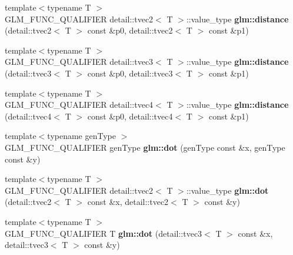 \begin{DoxyCompactItemize}
\item 
\hypertarget{namespaceglm_a02e1b17b70ee3ddd270c01aea45e5e82}{{\footnotesize template$<$typename T $>$ }\\\-G\-L\-M\-\_\-\-F\-U\-N\-C\-\_\-\-Q\-U\-A\-L\-I\-F\-I\-E\-R \*
detail\-::tvec2$<$ \-T $>$\-::value\-\_\-type {\bfseries glm\-::distance} (detail\-::tvec2$<$ \-T $>$ const \&p0, detail\-::tvec2$<$ \-T $>$ const \&p1)}\label{namespaceglm_a02e1b17b70ee3ddd270c01aea45e5e82}

\item 
\hypertarget{namespaceglm_a703b08cc8cd10426eb3885f4a9778706}{{\footnotesize template$<$typename T $>$ }\\\-G\-L\-M\-\_\-\-F\-U\-N\-C\-\_\-\-Q\-U\-A\-L\-I\-F\-I\-E\-R \*
detail\-::tvec3$<$ \-T $>$\-::value\-\_\-type {\bfseries glm\-::distance} (detail\-::tvec3$<$ \-T $>$ const \&p0, detail\-::tvec3$<$ \-T $>$ const \&p1)}\label{namespaceglm_a703b08cc8cd10426eb3885f4a9778706}

\item 
\hypertarget{namespaceglm_aba6ad5ff80b3e5400708fea100bf8a76}{{\footnotesize template$<$typename T $>$ }\\\-G\-L\-M\-\_\-\-F\-U\-N\-C\-\_\-\-Q\-U\-A\-L\-I\-F\-I\-E\-R \*
detail\-::tvec4$<$ \-T $>$\-::value\-\_\-type {\bfseries glm\-::distance} (detail\-::tvec4$<$ \-T $>$ const \&p0, detail\-::tvec4$<$ \-T $>$ const \&p1)}\label{namespaceglm_aba6ad5ff80b3e5400708fea100bf8a76}

\item 
\hypertarget{namespaceglm_aaa19f6c91c9d46f783e296789dfaf2d9}{{\footnotesize template$<$typename gen\-Type $>$ }\\\-G\-L\-M\-\_\-\-F\-U\-N\-C\-\_\-\-Q\-U\-A\-L\-I\-F\-I\-E\-R gen\-Type {\bfseries glm\-::dot} (gen\-Type const \&x, gen\-Type const \&y)}\label{namespaceglm_aaa19f6c91c9d46f783e296789dfaf2d9}

\item 
\hypertarget{namespaceglm_ae022826ddafad29a7a410455a905a0d6}{{\footnotesize template$<$typename T $>$ }\\\-G\-L\-M\-\_\-\-F\-U\-N\-C\-\_\-\-Q\-U\-A\-L\-I\-F\-I\-E\-R \*
detail\-::tvec2$<$ \-T $>$\-::value\-\_\-type {\bfseries glm\-::dot} (detail\-::tvec2$<$ \-T $>$ const \&x, detail\-::tvec2$<$ \-T $>$ const \&y)}\label{namespaceglm_ae022826ddafad29a7a410455a905a0d6}

\item 
\hypertarget{namespaceglm_a39dbf81749a2043a959bc11ea7810004}{{\footnotesize template$<$typename T $>$ }\\\-G\-L\-M\-\_\-\-F\-U\-N\-C\-\_\-\-Q\-U\-A\-L\-I\-F\-I\-E\-R \-T {\bfseries glm\-::dot} (detail\-::tvec3$<$ \-T $>$ const \&x, detail\-::tvec3$<$ \-T $>$ const \&y)}\label{namespaceglm_a39dbf81749a2043a959bc11ea7810004}


\end{DoxyCompactItemize}
